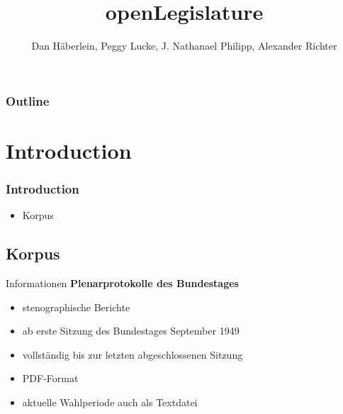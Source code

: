 \documentclass[11pt, a4paper]{beamer}
\author{Dan Häberlein, Peggy Lucke, J. Nathanael Philipp, Alexander Richter}
\title{openLegislature}
\date{}
\institute{Universität Leipzig}
\begin{document}
\section{}
\begin{frame}
\titlepage
\end{frame}


	\begin{frame}
		\frametitle{Outline}
		\tableofcontents
	\end{frame}

\section{Introduction}
\begin{frame}
\frametitle{Introduction}
\begin{itemize}
\item Korpus
\end{itemize}
\end{frame}

\subsection{Korpus}
\begin{frame}{Informationen}
\textbf{Plenarprotokolle des Bundestages}
\begin{itemize}
\item stenographische Berichte
\item ab erste Sitzung des Bundestages September 1949
\item vollständig bis zur letzten abgeschlossenen Sitzung
\item PDF-Format
\item aktuelle Wahlperiode auch als Textdatei
\end{itemize}
\end{frame}
\end{document}
